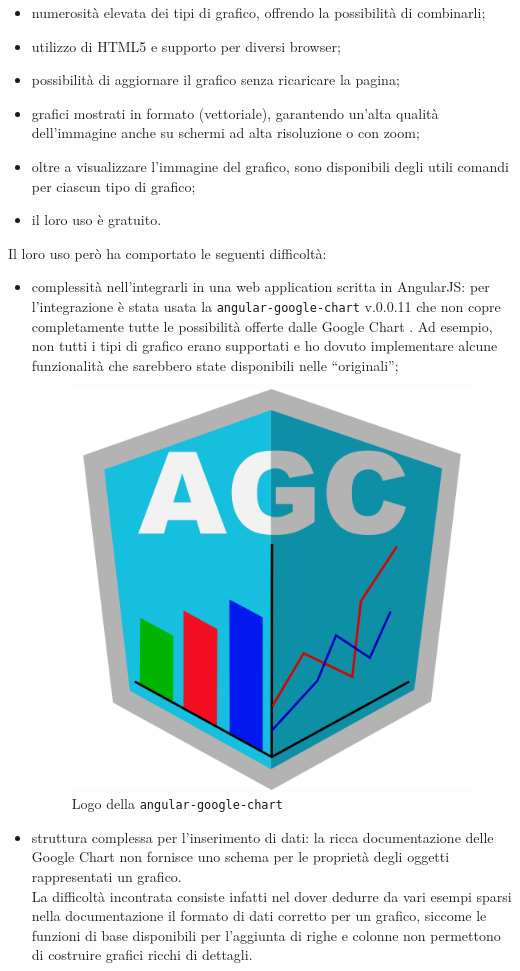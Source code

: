 \begin{itemize}
\item numerosità elevata dei tipi di grafico, offrendo la possibilità di
  combinarli;
\item utilizzo di HTML5 e supporto per diversi browser;
\item possibilità di aggiornare il grafico senza ricaricare la pagina;
\item grafici mostrati in formato  (vettoriale), garantendo un'alta
  qualità dell'immagine anche su schermi ad alta risoluzione o con zoom;
\item oltre a visualizzare l'immagine del grafico, sono disponibili degli
  utili comandi per ciascun tipo di grafico;
\item il loro uso è gratuito.
\end{itemize}

Il loro uso però ha comportato le seguenti difficoltà:

\begin{itemize}
\item complessità nell'integrarli in una web application scritta in AngularJS:
  per l'integrazione è stata usata la 
  \texttt{angular-google-chart} v.0.0.11 che non copre completamente tutte le
  possibilità offerte dalle Google Chart . Ad esempio, non tutti i
  tipi di grafico erano supportati e ho dovuto implementare alcune
  funzionalità che sarebbero state disponibili nelle  ``originali'';

\begin{figure}[H]%
\centering
\includegraphics[width=.5\columnwidth]{immagini/ang-goog-chart-logo}
\caption{Logo della  \texttt{angular-google-chart}}
\label{fig:logo-agc}%
\end{figure}

\item struttura complessa per l'inserimento di dati: la ricca documentazione
  delle Google Chart  non fornisce uno schema per le proprietà
  degli oggetti rappresentati un grafico. \\
  La difficoltà incontrata consiste infatti nel dover dedurre da vari esempi
  sparsi nella documentazione il formato di dati corretto per un grafico,
  siccome le funzioni di base disponibili per l'aggiunta di righe e colonne
  non permettono di costruire grafici ricchi di dettagli.
\end{itemize}


